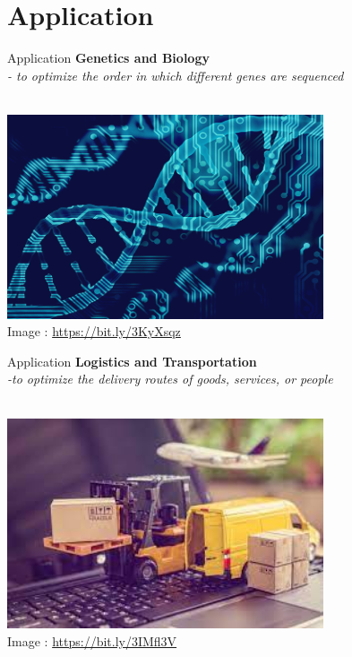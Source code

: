 \documentclass{beamer}
\begin{document}
\section{Application}

\begin{frame}{Application}
\textbf{Genetics and Biology}\\
\textit{- to optimize the order in which different genes are sequenced}\\
\\
\begin{center}
\includegraphics[width = 0.7\textwidth]{gene.jpg}\\
Image : \href{https://sapac.illumina.com/science/customer-stories/icommunity-customer-interviews-case-studies/retter-genedx-interview-dragen-bioinformatics.html}{https://bit.ly/3KyXsqz}
\end{center}
\end{frame}

\begin{frame}{Application}
\textbf{Logistics and Transportation}\\
\textit{-to optimize the delivery routes of goods, services, or people}\\
\\
\begin{center}
\includegraphics[width = 0.7\textwidth]{tsp1.jpg}\\
Image : \href{https://magenest.com/en/ecommerce-delivery/}{https://bit.ly/3IMfl3V}
\end{center}
\end{frame}
\end{document}
